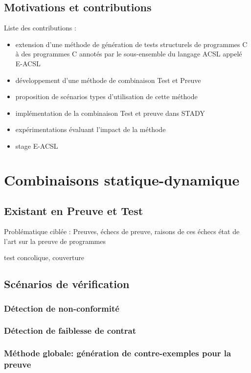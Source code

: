 \documentclass[french]{spimufcphdthesis}
\begin{document}
\chapter{Motivations et contributions}


Liste des contributions :
\begin{itemize}
\item extension d'une méthode de génération de tests structurels de programmes C
  à des programmes C annotés par le sous-ensemble du langage ACSL appelé E-ACSL
\item développement d'une méthode de combinaison Test et Preuve
\item proposition de scénarios types d'utilisation de cette méthode
\item implémentation de la combinaison Test et preuve dans STADY
\item expérimentations évaluant l'impact de la méthode
\item stage E-ACSL
\end{itemize}


\part{Combinaisons statique-dynamique}


\chapter{Existant en Preuve et Test}


Problématique ciblée : Preuves, échecs de
   preuve, raisons de ces échecs état de l'art sur la preuve de programmes
         
         test concolique, couverture


\chapter{Scénarios de vérification}


\section{Détection de non-conformité}
\section{Détection de faiblesse de contrat}
\section{Méthode globale: génération de contre-exemples pour la preuve}
\end{document}
